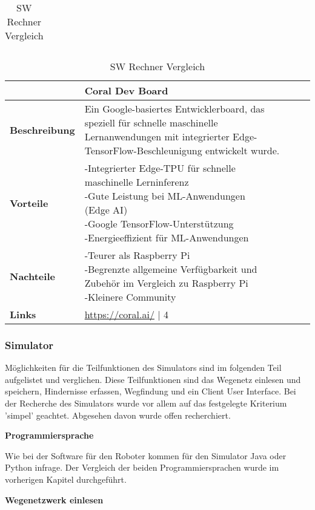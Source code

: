 \begin{table}[H]
\begin{tabularx}{\textwidth}{|l|X|X|}
  \hline
\end{tabularx}
\begin{tabularx}{\textwidth}{|l|X|X|}
\hline
\textbf{} & \textbf{Coral Dev Board} & \textbf{} \\
  \hline
  \textbf{Beschreibung} & Ein Google-basiertes Entwicklerboard, das speziell für schnelle maschinelle Lernanwendungen mit integrierter Edge-TensorFlow-Beschleunigung entwickelt wurde. & \\
  \hline
  \textbf{Vorteile}  & \makecell{
  -Integrierter Edge-TPU für schnelle\\maschinelle Lerninferenz \\
  -Gute Leistung bei ML-Anwendungen\\(Edge AI) \\
  -Google TensorFlow-Unterstützung \\
  -Energieeffizient für ML-Anwendungen
  } & \makecell{} \\
  \hline
  \textbf{Nachteile} & \makecell{
  -Teurer als Raspberry Pi \\
  -Begrenzte allgemeine Verfügbarkeit und\\Zubehör im Vergleich zu Raspberry Pi \\
  -Kleinere Community
  } & \makecell{} \\
  \hline
  \textbf{Links} & \url{https://coral.ai/} | 4 & \\
  \hline
\end{tabularx}
\caption{SW Rechner Vergleich}
\label{table:sw-pc-compare}
\end{table}

\newpage
\subsubsection{Simulator}

Möglichkeiten für die Teilfunktionen des Simulators sind im folgenden Teil aufgelistet und verglichen. Diese Teilfunktionen sind das Wegenetz einlesen und speichern, Hindernisse erfassen, Wegfindung und ein Client User Interface.
Bei der Recherche des Simulators wurde vor allem auf das festgelegte Kriterium 'simpel' geachtet. Abgesehen davon wurde offen recherchiert.

\textbf{Programmiersprache}

Wie bei der Software für den Roboter kommen für den Simulator Java oder Python infrage. Der Vergleich der beiden Programmiersprachen wurde im vorherigen Kapitel durchgeführt.

\textbf{Wegenetzwerk einlesen}

